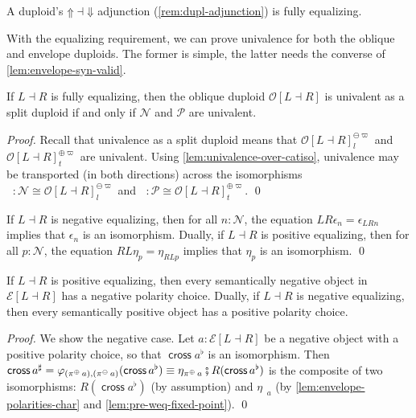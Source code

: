 \documentclass[runningheads]{llncs}
\makeatletter
\newcommand*{\sect}{Sec.\@}
\newcommand*\rocqlogo{\usebox{\rocqlogobox}}
\newcommand{\lemmaref}[3]{\href{https://github.com/UniMath/UniMath/blob/94fae0eda57a778cec704bfa73b4ff525c9bc475/#1\#L#2?name=#3}{\rocqlogo}}
\newcommand{\acat}[1]{\mathcal{#1}}
\newcommand{\PP}{\acat{P}}
\newcommand{\NN}{\acat{N}}
\newcommand{\OO}{\acat{O}}
\newcommand{\EE}{\acat{E}}
\newcommand{\Cl}[1]{#1_l}
\newcommand{\Ct}[1]{#1_t}
\newcommand{\Csn}[2]{#1^{\ominus#2}}
\newcommand{\Csp}[2]{#1^{\oplus#2}}
\newcommand{\Csnl}[2]{\Csn{\Cl{#1}}{#2}}
\newcommand{\Cspt}[2]{\Csp{\Ct{#1}}{#2}}
\newcommand{\Obl}[1]{\OO[#1]}
\newcommand{\Env}[1]{\EE[#1]}
\newcommand{\dcomp}{\fatsemi}
\newcommand{\upshift}{\mathord{\Uparrow}}
\newcommand{\downshift}{\mathord{\Downarrow}}
\newcommand{\projneg}{\mathop{\pi^{\ominus}}}
\newcommand{\projpos}{\mathop{\pi^{\oplus}}}
\newcommand{\crossmor}{\mathop{\mathsf{cross}}}
\newcommand{\innegO}{\mathop{\iota^{\ominus}_{\OO}}}
\newcommand{\inposO}{\mathop{\iota^{\oplus}_{\OO}}}
\makeatother
\begin{document}
\begin{exampledef}[{\cite[\sect{} 4.2]{MunchMaccagnoni14}}]
A duploid's \(\upshift \dashv \downshift\) adjunction (\autoref{rem:dupl-adjunction}) is fully equalizing.
\end{exampledef}

With the equalizing requirement, we can prove univalence for both the
oblique and envelope duploids. The former is simple, the latter needs
the converse of \autoref{lem:envelope-syn-valid}.

\begin{theorem}[{\lemmaref{UniMath/CategoryTheory/Nonassociative/Duploids/FromAdjunction/EqualizingRequirement.v}{740}{is\_univalent\_oblique\_duploid\_iff}}]
\label{thm:oblique-univalent}
If \(L \dashv R\) is fully equalizing, then the oblique duploid
\(\Obl{L \dashv R}\) is univalent as a split duploid if and only if
\(\NN\) and \(\PP\) are univalent.
\end{theorem}
\begin{proof}
Recall that univalence as a split duploid means that \(\Csnl{\Obl{L
\dashv R}}\varpi\) and \(\Cspt{\Obl{L \dashv R}}\varpi\) are
univalent. Using \autoref{lem:univalence-over-catiso}, univalence may be
transported (in both directions) across the isomorphisms \(\innegO :
\NN \cong \Csnl{\Obl{L \dashv R}}\varpi\) and \(\inposO : \PP \cong
\Cspt{\Obl{L \dashv R}}\varpi\).
\qed
\end{proof}

\begin{lemma}[{\lemmaref{UniMath/CategoryTheory/Nonassociative/Duploids/FromAdjunction/EqualizingRequirement.v}{252}{is\_negative\_fixed\_point\_from\_pre\_fixed\_point}}]
\label{lem:pre-weq-fixed-point}
If \(L \dashv R\) is negative equalizing, then for all \(n : \NN\),
the equation \(LR\epsilon_n = \epsilon_{LRn}\) implies that
\(\epsilon_n\) is an isomorphism. Dually, if \(L \dashv R\) is
positive equalizing, then for all \(p : \NN\), the equation \(RL\eta_p
= \eta_{RLp}\) implies that \(\eta_p\) is an isomorphism.
\qed
\end{lemma}

\begin{lemma}[{\lemmaref{UniMath/CategoryTheory/Nonassociative/Duploids/FromAdjunction/EqualizingRequirement.v}{794}{envelope\_chosen\_negative\_from\_negative}}]
\label{lem:chosen-negative-iff-negative}
If \(L \dashv R\) is positive equalizing, then every semantically
negative object in \(\Env{L \dashv R}\) has a negative polarity
choice. Dually, if \(L \dashv R\) is negative equalizing, then every
semantically positive object has a positive polarity choice.
\end{lemma}
\begin{proof}
We show the negative case. Let \(a : \Env{L \dashv R}\) be a negative
object with a positive polarity choice, so that \(\crossmor
a^\flat\) is an isomorphism.
Then \(\crossmor a^\sharp =
\varphi_{(\projpos a),(\projneg a)}(\crossmor a^\flat) \equiv
\eta_{\projpos a} \dcomp R(\crossmor a^\flat)\) is the composite of
two isomorphisms: \(R(\crossmor a^\flat)\) (by assumption) and
\(\eta_{\projpos a}\) (by \autoref{lem:envelope-polarities-char} and
\autoref{lem:pre-weq-fixed-point}).
\qed
\end{proof}
\end{document}
